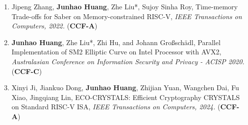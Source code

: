 \documentclass[letterpaper,11pt]{article}
\newlength{\outerbordwidth}
\newcommand{\resitem}[1]{\item #1 \vspace{-2pt}}
\newcommand{\resheading}[1]{\vspace{-5pt}%
  \parbox{\textwidth}{\setlength{\FrameSep}{\outerbordwidth}
    \begin{shaded}
\setlength{\fboxsep}{0pt}\framebox[\textwidth][l]{\setlength{\fboxsep}{4pt}\fcolorbox{shadecolorB}{shadecolorB}{\textbf{\sffamily{\mbox{~}\makebox[6.762in][l]{\large #1} \vphantom{p\^{E}}}}}}
    \end{shaded}
  }\vspace{-10pt}%
}
\begin{document}
\begin{enumerate}
{	}
	\item {Jipeng Zhang, \textbf{Junhao Huang}, Zhe Liu*, Sujoy Sinha Roy, Time-memory Trade-offs for Saber on Memory-constrained RISC-V, \textit{IEEE Transactions on Computers, 2022.} (\textbf{CCF-A})
	}
	\item {\textbf{Junhao Huang}, Zhe Liu*, Zhi Hu, and Johann Großschädl, Parallel Implementation of SM2 Elliptic Curve on Intel Processor with AVX2, \textit{Australasian Conference on Information Security and Privacy - ACISP 2020.} (\textbf{CCF-C})
	}
	\item {Xinyi Ji, Jiankuo Dong, \textbf{Junhao Huang}, Zhijian Yuan, Wangchen Dai, Fu Xiao, Jingqiang Lin, ECO-CRYSTALS: Efficient Cryptography CRYSTALS on Standard RISC-V ISA, \textit{IEEE Transactions on Computers, 2024.} (\textbf{CCF-A})
	}
\end{enumerate}

\end{document}
